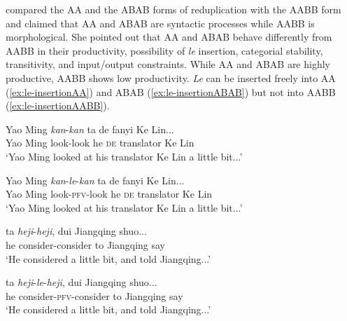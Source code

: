 \citet{Xie2020} compared the AA and the ABAB forms of reduplication with the AABB form and claimed that AA and ABAB are syntactic processes while AABB is morphological.
She pointed out that AA and ABAB behave differently from AABB in their productivity, possibility of \textit{le} insertion, categorial stability, transitivity, and input/output constraints.
While AA and ABAB are highly productive, AABB shows low productivity. 
\textit{Le} can be inserted freely into AA (\ref{ex:le-insertionAA}) and ABAB (\ref{ex:le-insertionABAB}) but not into AABB (\ref{ex:le-insertionAABB}).

\settowidth{}

\ea\label{ex:le-insertionAA}
  \ea \gll Yao Ming \textit{kan}-\textit{kan} ta de fanyi Ke Lin...\\
  Yao Ming look-look he \textsc{de} translator Ke Lin\\
  \glt `Yao Ming looked at his translator Ke Lin a little bit...'
  
  \ex \gll Yao Ming \textit{kan}-\textit{le}-\textit{kan} ta de fanyi Ke Lin...\\
  Yao Ming look-\textsc{pfv}-look he \textsc{de} translator Ke Lin\\ 
  \glt `Yao Ming looked at his translator Ke Lin a little bit...'
  \z
\z

\ea\label{ex:le-insertionABAB}
  \ea \gll ta \textit{heji}-\textit{heji}, dui Jiangqing shuo...\\
  he consider-consider to Jiangqing say\\
 \glt `He considered a little bit, and told Jiangqing...'
 
  \ex \gll ta \textit{heji}-\textit{le}-\textit{heji}, dui Jiangqing shuo...\\
  he consider-\textsc{pfv}-consider to Jiangqing say\\ 
  \glt `He considered a little bit, and told Jiangqing...'
  \z
\z

\ea\label{ex:le-insertionAABB}
  
  \z
\z

